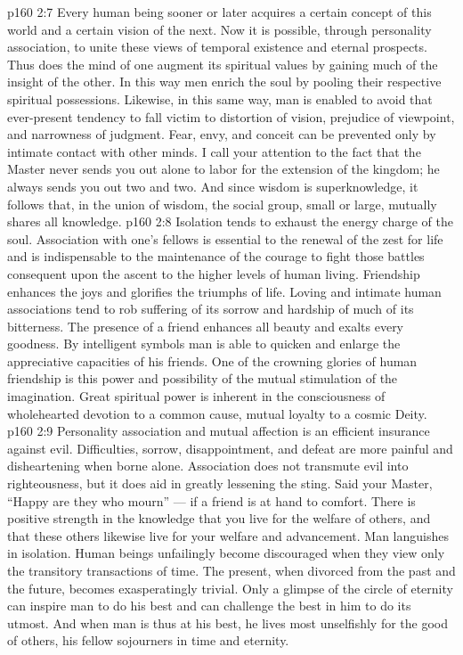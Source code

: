 \vs p160 2:7 \pc {}\bibnobreakspace {} Every human being sooner or later acquires a certain concept of this world and a certain vision of the next. Now it is possible, through personality association, to unite these views of temporal existence and eternal prospects. Thus does the mind of one augment its spiritual values by gaining much of the insight of the other. In this way men enrich the soul by pooling their respective spiritual possessions. Likewise, in this same way, man is enabled to avoid that ever\hyp{}present tendency to fall victim to distortion of vision, prejudice of viewpoint, and narrowness of judgment. Fear, envy, and conceit can be prevented only by intimate contact with other minds. I call your attention to the fact that the Master never sends you out alone to labor for the extension of the kingdom; he always sends you out two and two. And since wisdom is superknowledge, it follows that, in the union of wisdom, the social group, small or large, mutually shares all knowledge.
\vs p160 2:8 \pc {}\bibnobreakspace {} Isolation tends to exhaust the energy charge of the soul. Association with one’s fellows is essential to the renewal of the zest for life and is indispensable to the maintenance of the courage to fight those battles consequent upon the ascent to the higher levels of human living. Friendship enhances the joys and glorifies the triumphs of life. Loving and intimate human associations tend to rob suffering of its sorrow and hardship of much of its bitterness. The presence of a friend enhances all beauty and exalts every goodness. By intelligent symbols man is able to quicken and enlarge the appreciative capacities of his friends. One of the crowning glories of human friendship is this power and possibility of the mutual stimulation of the imagination. Great spiritual power is inherent in the consciousness of wholehearted devotion to a common cause, mutual loyalty to a cosmic Deity.
\vs p160 2:9 \pc {}\bibnobreakspace {} Personality association and mutual affection is an efficient insurance against evil. Difficulties, sorrow, disappointment, and defeat are more painful and disheartening when borne alone. Association does not transmute evil into righteousness, but it does aid in greatly lessening the sting. Said your Master, \textcolor{ubdarkred}{“Happy are they who mourn”} --- if a friend is at hand to comfort. There is positive strength in the knowledge that you live for the welfare of others, and that these others likewise live for your welfare and advancement. Man languishes in isolation. Human beings unfailingly become discouraged when they view only the transitory transactions of time. The present, when divorced from the past and the future, becomes exasperatingly trivial. Only a glimpse of the circle of eternity can inspire man to do his best and can challenge the best in him to do its utmost. And when man is thus at his best, he lives most unselfishly for the good of others, his fellow sojourners in time and eternity.
